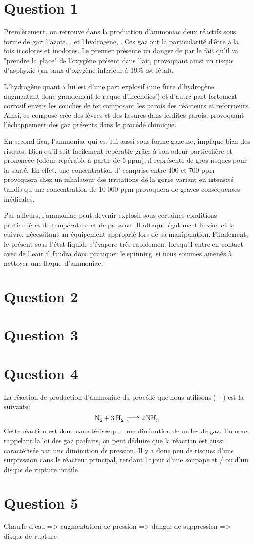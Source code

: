 \documentclass[a4paper,12pt, oneside]{article}
\begin{document}
\section*{Question 1}
Premièrement, on retrouve dans la production d'ammoniac deux réactifs sous forme de gaz: l'azote, , et l'hydrogène, . Ces gaz ont la particularité d'être à la fois incolores et inodores. Le premier présente un danger de par le fait qu'il va "prendre la place" de l'oxygène présent dans l'air, provoquant ainsi un risque d'asphyxie (un taux d'oxygène inférieur à 19\% est létal). 
		
		L'hydrogène quant à lui est d'une part explosif (une fuite d'hydrogène augmentant donc grandement le risque d'incendies!) et d'autre part fortement corrosif envers les couches de fer composant les parois des réacteurs et reformeurs. Ainsi, ce composé crée des lèvres et des fissures dans lesdites parois, provoquant l'échappement des gaz présents dans le procédé chimique.
		
		En second lieu, l'ammoniac qui est lui aussi sous forme gazeuse, implique bien des risques. Bien qu'il soit facilement repérable grâce à son odeur particulière et prononcée (odeur repérable à partir de 5 ppm), il représente de gros risques pour la santé. En effet, une concentration d' comprise entre 400 et 700 ppm provoquera chez un inhalateur des irritations de la gorge variant en intensité tandis qu'une concentration de 10 000 ppm provoquera de graves conséquences médicales.

		Par ailleurs, l'ammoniac peut devenir explosif sous certaines conditions particulières de température et de pression. Il attaque également le zinc et le cuivre, nécessitant un équipement approprié lors de sa manipulation. Finalement, le  présent sous l'état liquide s'évapore très rapidement lorsqu'il entre en contact avec de l'eau: il faudra donc pratiquer le \og spinning\fg \ si nous sommes amenés à nettoyer une \og flaque\fg \ d'ammoniac.
		
\section*{Question 2}

\section*{Question 3}

\section*{Question 4}
La réaction de production d'ammoniac du procédé que nous utilisons ( - ) est la suivante:
$$\ce{N2 +3H2 <=> 2NH3}$$
Cette réaction est donc caractérisée par une diminution de moles de gaz. En nous rappelant la loi des gaz parfaits, on peut déduire que la réaction est aussi caractérisée par une diminution de pression. Il y a donc peu de risques d'une surpression dans le réacteur principal, rendant l'ajout d'une soupape et / ou d'un disque de rupture inutile.

\section*{Question 5}
Chauffe d'eau => augmentation de pression => danger de suppression => disque de rupture
\end{document}
